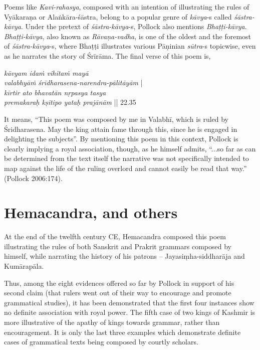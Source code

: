 Poems like {\sl Kavi-rahasya}, composed with an intention of illustrating the rules of Vyākaraṇa or Alaṅkāra-śāstra, belong to a popular genre of {\sl kāvya}-s called {\sl śāstra-kāvya}. Under the pretext of {\sl śāstra-kāvya}-s, Pollock also mentions {\sl Bhaṭṭi-kāvya}. {\sl Bhaṭṭi-kāvya}, also known as {\sl Rāvaṇa-vadha}, is one of the oldest and the foremost of {\sl śāstra-kāvya}-s, where Bhaṭṭi illustrates various Pāṇinian {\sl sūtra}-s topicwise, even as he narrates the story of Śrīrāma. The final verse of this poem is,
\begin{myquote}
{{\sl kāvyam idaṁ vihitaṁ mayā}}\\[2pt]
\phantom{\quad} {{\sl valabhyāṁ śrīdharasena-narendra-pālitāyām}} |\\[2pt]
{{\sl kīrtir ato bhavatān nṛpasya tasya}}\\[2pt] 
\phantom{\quad} {{\sl  premakaraḥ kṣitipo yataḥ prajānām}} || 22.35 
\end{myquote}
It means, ``This poem was composed by me in Valabhī, which is ruled by Śridharasena. May the king attain fame through this, since he is engaged in delighting the subjects''. By mentioning this poem in this context, Pollock is clearly implying a royal association, though, as he himself admits, ``...so far as can be determined from the text itself the narrative was not specifically intended to map against the life of the ruling overlord and cannot easily be read that way.'' (Pollock 2006:174). 

\section{Hemacandra, and others}\label{chap3-sec15}

At the end of the twelfth century CE, Hemacandra composed this poem illustrating the rules of both Sanskrit and Prakrit grammars composed by himself, while narrating the history of his patrons -- Jayasiṃha-siddharāja and Kumārapāla.

Thus, among the eight evidences offered so far by Pollock in support of his second claim (that rulers went out of their way to encourage and promote grammatical studies), it has been demonstrated that the first four instances show no definite association with royal power. The fifth case of two kings of Kashmir is more illustrative of the apathy of kings towards grammar, rather than encouragement. It is only the last three examples which demonstrate definite cases of grammatical texts being composed by courtly scholars.

